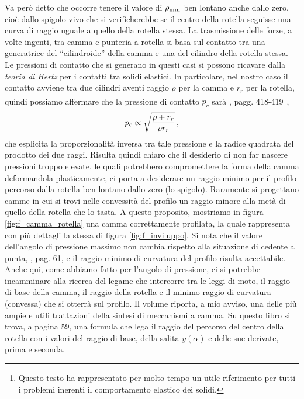 \noindent Va per\`o detto che occorre tenere il valore di ${\rho}_{\rm min}$
ben lontano anche dallo zero, cio\`e dallo spigolo vivo che si verificherebbe
se il centro della rotella seguisse  una curva di raggio uguale a quello della rotella stessa.
La trasmissione delle forze, a volte ingenti, tra camma e punteria a rotella si basa
sul contatto tra una generatrice del ``cilindroide'' della camma e una del
cilindro della rotella stessa. Le pressioni di contatto che si generano in questi casi
si possono ricavare dalla {\em teoria di Hertz} per i contatti tra solidi elastici.
In particolare, nel nostro caso il contatto avviene tra due cilindri aventi raggio
$\rho$ per la camma e $r_r$ per la rotella, quindi possiamo affermare che la pressione di contatto
$p_c$ sar\`a \cite{timoshenko}, pagg. 418-419\footnote{Questo testo ha rappresentato per  
molto tempo un utile riferimento per tutti i problemi inerenti
il comportamento elastico dei solidi.},
\begin{equation}
p_c \propto \sqrt {{\rho + r_r}\over {\rho r_r}}\,,
\label{eq_hertz}
\end{equation}
\noindent che esplicita la proporzionalit\`a inversa tra tale pressione e la radice
quadrata del prodotto dei due raggi. Risulta quindi chiaro che il desiderio
di non far nascere pressioni troppo elevate, le quali potrebbero compromettere
la forma della
camma deformandola plasticamente, ci porta a desiderare un raggio minimo per il
profilo percorso dalla rotella ben lontano dallo zero
(lo spigolo). Raramente si progettano camme in cui si trovi nelle convessit\`a
del profilo un raggio minore alla met\`a di quello della rotella che lo tasta.
A questo proposito, mostriamo in figura \ref{fig:f_camma_rotella} una camma
correttamente profilata, la quale rappresenta con pi\`u
dettagli la stessa di figura \ref{fig:f_inviluppo}. Si nota che il valore dell'angolo
di pressione massimo non cambia rispetto alla situazione di cedente a punta,
\cite{molian}, pag. 61,
e il raggio minimo di curvatura del profilo risulta
accettabile.
Anche qui, come abbiamo fatto per l'angolo di pressione, ci si potrebbe incamminare alla ricerca
del legame che intercorre tra le leggi di moto, il raggio di base della camma, il raggio della rotella e  
il minimo raggio di curvatura (convessa) che si otterr\`a sul profilo.
Il volume \cite{ruggieri} riporta, a mio avviso, una delle pi\`u ampie e utili
trattazioni della sintesi di meccanismi a camma. Su questo libro si trova,
a pagina 59, una formula che lega il raggio del percorso del centro della rotella
con i valori del raggio di base, della salita $y(\alpha)$ e delle sue derivate, prima e seconda.
